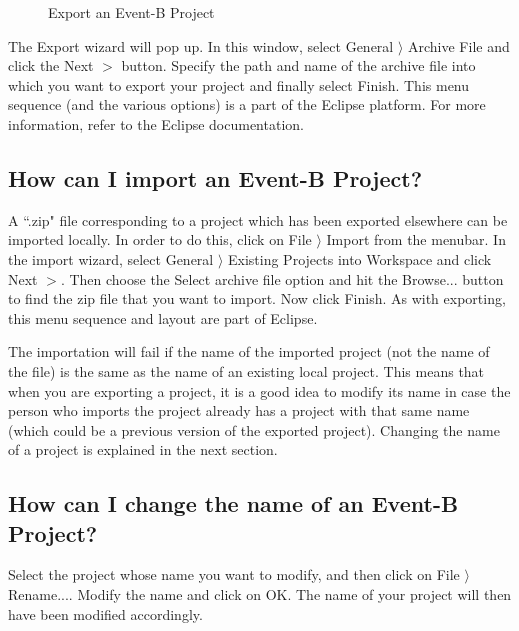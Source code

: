 \begin{figure}[!ht]
\begin{center}
	\caption{Export an Event-B Project}
	\label{fig_faq_exportproject}
\end{center}
\end{figure}

The \textsf{Export} wizard will pop up. In this window, select \textsf{General $\rangle$ Archive File} and click the \textsf{Next $>$} button. Specify the path and name of the archive file into which you want to export your project and finally select \textsf{Finish}. This menu sequence (and the various options) is a part of the Eclipse platform. For more information, refer to the Eclipse documentation. 

\subsection{How can I import an Event-B Project?}

A ``.zip" file corresponding to a project which has been exported elsewhere can be imported locally. In order to do this, click on \textsf{File $\rangle$ Import} from the menubar. In the import wizard, select \textsf{General $\rangle$ Existing Projects into Workspace} and click \textsf{Next $>$}. Then choose the \textsf{Select archive file} option and hit the \textsf{Browse...} button to find the zip file that you want to import. Now click \textsf{Finish}. As with exporting, this menu sequence and layout are part of Eclipse.

The importation will fail if the name of the imported project (not the name of the file) is the same as the name of an existing local project. This means that when you are exporting a project, it is a good idea to modify its name in case the person who imports the project already has a project with that same name (which could be a previous version of the exported project). Changing the name of a project is explained in the next section. 

\subsection{How can I change the name of an Event-B Project?}

Select the project whose name you want to modify, and then click on \textsf{File $\rangle$ Rename...}. Modify the name and click on \textsf{OK}. The name of your project will then have been modified accordingly. 

